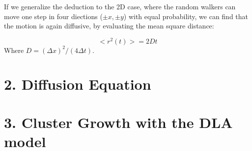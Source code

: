 \documentclass[aps,prl,preprint,superscriptaddress]{revtex4}
\begin{document}
	If we generalize the deduction to the 2D case, where the random walkers can move one step in four diections ($\pm x, \pm y$) with equal probability, we can find that the motion is again diffusive, by evaluating the mean square distance:
	
	\begin{equation}
	<r^2(t)> = 2Dt
	\end{equation}
	Where $D = (\Delta x)^2/(4\Delta t)$. 
	
	\section{2. Diffusion Equation}
	
	\section{3. Cluster Growth with the DLA model}



	
\end{document}

